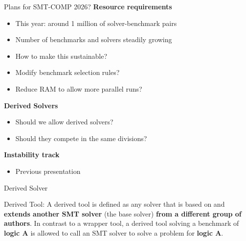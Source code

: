 \documentclass[table]{beamer}
\begin{document}
\begin{frame}{Plans for SMT-COMP 2026?}
  \textbf{Resource requirements}
  \begin{itemize}
  \item This year: around 1 million of solver-benchmark pairs
  \item Number of benchmarks and solvers steadily growing
  \item How to make this sustainable?
  \item Modify benchmark selection rules?
  \item Reduce RAM to allow more parallel runs?
  \end{itemize}

  \bigskip
  \textbf{Derived Solvers}
  \begin{itemize}
  \item Should we allow derived solvers?
  \item Should they compete in the same divisions?
  \end{itemize}

  \bigskip

  \textbf{Instability track}
  \begin{itemize}
  \item Previous presentation \smiley
  \end{itemize}
\end{frame}


\begin{frame}{Derived Solver}
  
  Derived Tool: A derived tool is defined as any solver that is based on and \textbf{extends another SMT
solver} (the base solver) \textbf{from a different group of authors}. In contrast to a wrapper tool, a derived
tool solving a benchmark of \textbf{logic A} is allowed to call an SMT solver to solve a problem for \textbf{logic
A}.
\end{frame}

\end{document}
